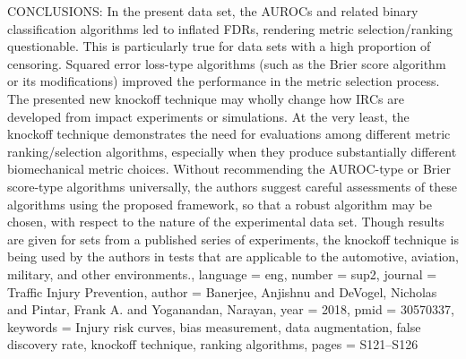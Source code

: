 {{CONCLUSIONS: In the present data set, the AUROCs and related binary classification algorithms led to inflated FDRs, rendering metric selection/ranking questionable. This is particularly true for data sets with a high proportion of censoring. Squared error loss-type algorithms (such as the Brier score algorithm or its modifications) improved the performance in the metric selection process. The presented new knockoff technique may wholly change how IRCs are developed from impact experiments or simulations. At the very least, the knockoff technique demonstrates the need for evaluations among different metric ranking/selection algorithms, especially when they produce substantially different biomechanical metric choices. Without recommending the AUROC-type or Brier score-type algorithms universally, the authors suggest careful assessments of these algorithms using the proposed framework, so that a robust algorithm may be chosen, with respect to the nature of the experimental data set. Though results are given for sets from a published series of experiments, the knockoff technique is being used by the authors in tests that are applicable to the automotive, aviation, military, and other environments.},
	language = {eng},
	number = {sup2},
	journal = {Traffic Injury Prevention},
	author = {Banerjee, Anjishnu and DeVogel, Nicholas and Pintar, Frank A. and Yoganandan, Narayan},
	year = {2018},
	pmid = {30570337},
	keywords = {Injury risk curves, bias measurement, data augmentation, false discovery rate, knockoff technique, ranking algorithms},
	pages = {S121--S126}
}

